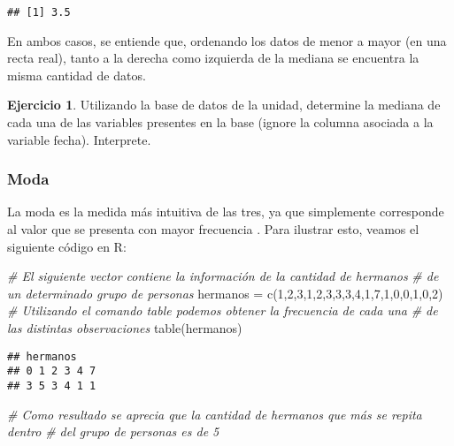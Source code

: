 \documentclass[
]{book}
\newenvironment{Shaded}{\begin{snugshade}}{\end{snugshade}}
\newcommand{\CommentTok}[1]{\textcolor[rgb]{0.56,0.35,0.01}{\textit{#1}}}
\newcommand{\DecValTok}[1]{\textcolor[rgb]{0.00,0.00,0.81}{#1}}
\newcommand{\FunctionTok}[1]{\textcolor[rgb]{0.00,0.00,0.00}{#1}}
\newcommand{\NormalTok}[1]{#1}
\newcommand{\OtherTok}[1]{\textcolor[rgb]{0.56,0.35,0.01}{#1}}
\theoremstyle{definition}
\theoremstyle{definition}
\theoremstyle{definition}
\newtheorem{exercise}{Ejercicio}[chapter]
\theoremstyle{definition}
\theoremstyle{remark}
\begin{document}
\begin{verbatim}
## [1] 3.5
\end{verbatim}

En ambos casos, se entiende que, ordenando los datos de menor a mayor (en una recta real), tanto a la derecha como izquierda de la mediana se encuentra la misma cantidad de datos.

\begin{exercise}
Utilizando la base de datos de la unidad, determine la mediana de cada una de las variables presentes en la base (ignore la columna asociada a la variable fecha). Interprete.
\end{exercise}

\hypertarget{moda}{%
\subsubsection*{Moda}\label{moda}}

La moda es la medida más intuitiva de las tres, ya que simplemente corresponde al valor que se presenta con mayor frecuencia \citep[página 85]{anderson}. Para ilustrar esto, veamos el siguiente código en R:

\begin{Shaded}
\begin{Highlighting}[]
\CommentTok{\# El siguiente vector contiene la información de la cantidad de hermanos }
\CommentTok{\# de un determinado grupo de personas}
\NormalTok{hermanos }\OtherTok{=} \FunctionTok{c}\NormalTok{(}\DecValTok{1}\NormalTok{,}\DecValTok{2}\NormalTok{,}\DecValTok{3}\NormalTok{,}\DecValTok{1}\NormalTok{,}\DecValTok{2}\NormalTok{,}\DecValTok{3}\NormalTok{,}\DecValTok{3}\NormalTok{,}\DecValTok{3}\NormalTok{,}\DecValTok{4}\NormalTok{,}\DecValTok{1}\NormalTok{,}\DecValTok{7}\NormalTok{,}\DecValTok{1}\NormalTok{,}\DecValTok{0}\NormalTok{,}\DecValTok{0}\NormalTok{,}\DecValTok{1}\NormalTok{,}\DecValTok{0}\NormalTok{,}\DecValTok{2}\NormalTok{)}
\CommentTok{\# Utilizando el comando table podemos obtener la frecuencia de cada una }
\CommentTok{\# de las distintas observaciones}
\FunctionTok{table}\NormalTok{(hermanos)}
\end{Highlighting}
\end{Shaded}

\begin{verbatim}
## hermanos
## 0 1 2 3 4 7 
## 3 5 3 4 1 1
\end{verbatim}

\begin{Shaded}
\begin{Highlighting}[]
\CommentTok{\# Como resultado se aprecia que la cantidad de hermanos que más se repita dentro }
\CommentTok{\# del grupo de personas es de 5}
\end{Highlighting}
\end{Shaded}
\end{document}
